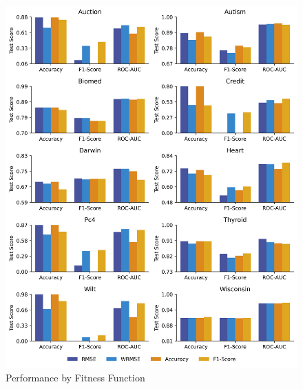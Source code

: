 
    \begin{figure}[H]
    \centering
    \includegraphics[width=\linewidth]{../Latex/Chapters/Figures/Results/fitness_test_performance.png}
    \caption{Performance by Fitness Function}
    \label{fig:fitness_test_performance}
    \end{figure}
    